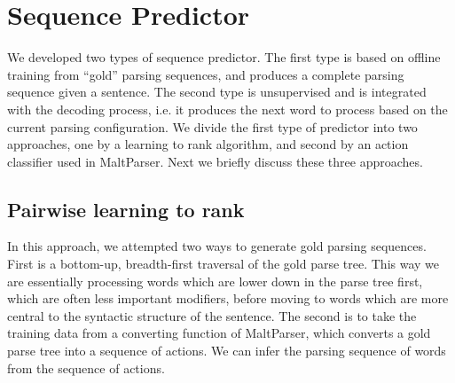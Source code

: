 \section{Sequence Predictor}
We developed two types of sequence predictor. The first type is based on
offline training from ``gold'' parsing sequences, and produces a complete
parsing sequence given a sentence. The second type is unsupervised and is
integrated with the decoding process, i.e. it produces the next word to
process based on the current parsing configuration.
We divide the first type of predictor into two approaches, one by a learning
to rank algorithm, and second by an action classifier used in MaltParser.
Next we briefly discuss these three approaches.

%

\subsection{Pairwise learning to rank}
In this approach, we attempted two ways to generate gold parsing sequences.
First is a bottom-up, breadth-first traversal of the gold parse tree. This
way we are essentially processing words which are lower down in the parse
tree first, which are often less important modifiers, before moving to words
which are more central to the syntactic structure of the sentence.
The second is to take the training data from a converting function of
MaltParser, which converts a gold parse tree into a sequence of actions.
We can infer the parsing sequence of words from the sequence of actions.

